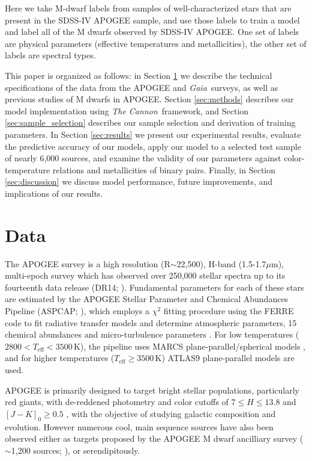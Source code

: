 \documentclass[twocolumn]{aastex62}
\newcommand{\thecannon}{\textsl{The Cannon}}
\newcommand{\gaia}{\textsl{Gaia}}
\newcommand{\teff}{T_{\mathrm{eff}}}
\begin{document}
Here we take M-dwarf labels from samples of well-characterized stars that are present in the
SDSS-IV APOGEE sample, and use those labels to train a model and label all of the M dwarfs observed by
SDSS-IV APOGEE. One set of labels are physical parameters (effective temperatures and metallicities), the other set of labels are spectral types. 

This paper is organized as follows: in Section \ref{sec:data} we describe the technical specifications of the data from the APOGEE and \gaia\ surveys, as well as previous studies of M dwarfs in APOGEE.
Section \ref{sec:methods} describes our model implementation using \thecannon\ framework, and Section \ref{sec:sample_selection} describes our sample selection and derivation of training parameters.
In Section \ref{sec:results} we present our experimental results, evaluate the predictive accuracy of our models, apply our model to a selected test sample of nearly 6,000 sources, and examine the validity of our parameters against color-temperature relations and metallicities of binary pairs.
Finally, in Section \ref{sec:discussion} we discuss model performance, future improvements, and implications of our results. 


\section{Data} \label{sec:data}

The APOGEE survey is a high resolution (R$\sim$22,500), H-band (1.5-1.7$\mu$m), multi-epoch survey which has observed over 250,000 stellar spectra up to its fourteenth data release (DR14; \citealt{Abolfathi:2017}). Fundamental parameters for each of these stars are estimated by the APOGEE Stellar Parameter and Chemical Abundances Pipeline (ASPCAP; \citealt{Perez:2016}), which employs a $\chi^2$ fitting procedure using the FERRE code to fit radiative transfer models and determine atmospheric parameters, 15 chemical abundances and micro-turbulence parameters \citep{Meszaros:2012}. For low temperatures ($2800<\teff<3500$\,K), the pipeline uses MARCS plane-parallel/spherical models \citep{Gustafsson:2008}, and for higher temperatures ($\teff\geq3500$\,K) ATLAS9 \citep{Castelli:2004} plane-parallel models are used.

APOGEE is primarily designed to target bright stellar populations, particularly red giants, with de-reddened photometry and color cutoffs of $7 \leq H \leq 13.8$ and $[J-K]_0 \geq 0.5$ \citep{Zasowski:2013}, with the objective of studying galactic composition and evolution. However numerous cool, main sequence sources have also been observed either as targets proposed by the APOGEE M dwarf ancilliary survey ($\sim$1,200 sources; \citealt{Desphande:2013}), or serendipitously. 
\end{document}
